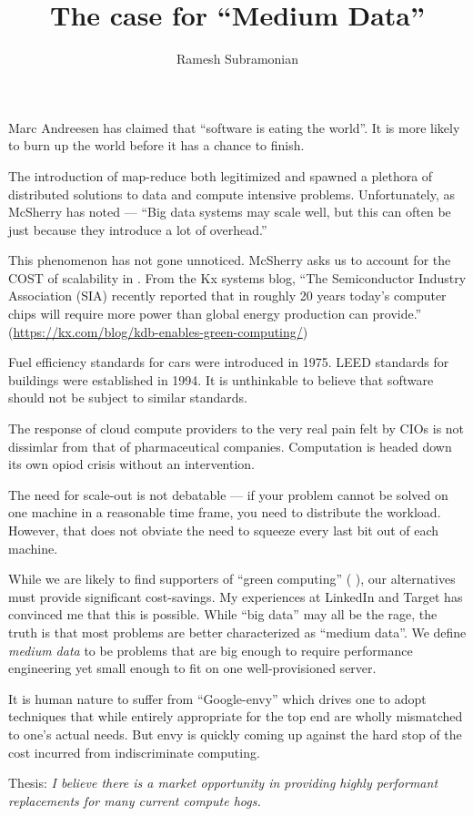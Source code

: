 \documentclass[12pt,letterpaper]{article}
\begin{document}
\title{The case for ``Medium Data''}
\author{ Ramesh Subramonian }
\maketitle
\thispagestyle{fancy}
\lhead{}
\chead{}
\rhead{}
\lfoot{}
\rfoot{{\small \thepage}}

Marc Andreesen has claimed that ``software is eating the world''. It is more
likely to burn up the world before it has a chance to finish.

The introduction of map-reduce \cite{mapreduce2004} both legitimized and spawned a plethora
of distributed solutions to data and compute intensive problems. Unfortunately,
as McSherry has noted --- ``Big data systems may scale well, but this can often
be just because they introduce a lot of overhead.''

This phenomenon has not gone unnoticed. 
McSherry asks us to account for the COST of scalability in \cite{McSherry2015}.
From the Kx systems blog, ``The Semiconductor Industry Association (SIA)
recently reported that in roughly 20 years today’s computer chips will require
more power than global energy production can provide.''
(\url{https://kx.com/blog/kdb-enables-green-computing/})

Fuel efficiency standards for cars were introduced in 1975. LEED standards for
buildings were
established in 1994. It is unthinkable to believe that software should not be
subject to similar standards.

The response of cloud compute providers to the very real pain felt by CIOs is
not dissimlar from that of pharmaceutical companies. 
Computation is headed down its own opiod crisis without an intervention.


The need for scale-out is not debatable --- if your problem cannot be solved on
one machine in a reasonable time frame, you need to distribute the workload.
However, that does not obviate the need to squeeze every last bit out of each
machine. 


While we are likely to find supporters of ``green computing'' (
\cite{Limits2018}), our alternatives must provide significant cost-savings. 
My experiences at LinkedIn and Target has convinced me that this is possible.
While ``big data'' may all be the rage, the truth is that most problems are
better characterized as ``medium data''. We define {\em medium data} to be
problems that are big enough to require performance engineering yet small enough
to fit on one well-provisioned server.

It is human nature to suffer from ``Google-envy'' which drives one to adopt
techniques that while entirely appropriate for the top end are wholly mismatched to one's
actual needs. But envy is quickly coming up against the hard stop of the cost
incurred from indiscriminate computing.

Thesis: {\em I believe there is a market opportunity in providing highly 
performant replacements for many current compute hogs. }


\end{document}
